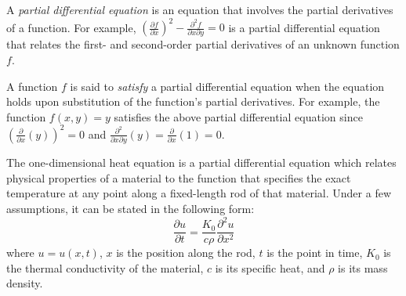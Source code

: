 A \emph{partial differential equation} is an equation that involves
the partial derivatives of a function.  For example,
$(\frac{\partial f}{\partial x})^2 - \frac{\partial^2 f}{\partial x
\partial y} = 0$ is a partial differential equation that relates
the first- and second-order partial derivatives of an unknown function
$f$.

A function $f$ is said to \emph{satisfy} a partial differential
equation when the equation holds upon substitution of the function's
partial derivatives.  For example, the function $f(x, y) = y$
satisfies the above partial differential equation since
$(\frac{\partial}{\partial x}(y))^2 = 0$ and $\frac{\partial^2}{\partial x \partial y}(y) = \frac{\partial}{\partial x}(1) = 0$.

The one-dimensional heat equation is a partial differential equation
which relates physical properties of a material to the function that
specifies the exact temperature at any point along a fixed-length rod
of that material.  Under a few assumptions, it can be stated in the
following form:
\begin{equation}
\frac{\partial u}{\partial t} = \frac{K_0}{c\rho} \frac{\partial^2 u}{\partial x^2} \label{eqn:heat}
\end{equation}
where $u = u(x,t)$, $x$ is the position along the rod, $t$ is the point in time,
$K_0$ is the thermal conductivity of the material, $c$ is its specific heat,
and $\rho$ is its mass density.

